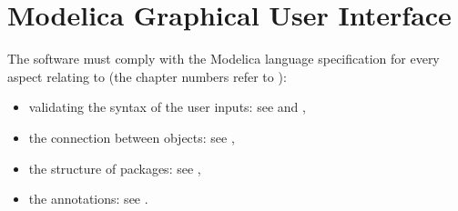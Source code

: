 \documentclass[letterpaper,10pt, openany,english]{sphinxmanual}
\begin{document}
\section{Modelica Graphical User Interface}
\label{\detokenize{requirements:modelica-graphical-user-interface}}\label{\detokenize{requirements:par-modelica-gui}}
The software must comply with the Modelica language specification  for every aspect relating to (the chapter numbers refer to ):
\begin{itemize}
\item {} 
validating the syntax of the user inputs: see  and ,

\item {} 
the connection between objects: see ,

\item {} 
the structure of packages: see ,

\item {} 
the annotations: see .

\end{itemize}
\end{document}
